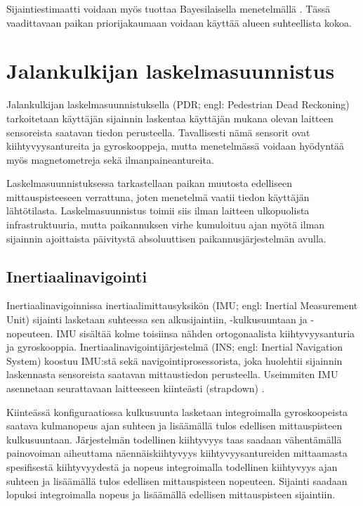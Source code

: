 Sijaintiestimaatti voidaan myös tuottaa Bayesilaisella menetelmällä
\cite{honkavirta2009}. Tässä vaadittavaan paikan priorijakaumaan voidaan
käyttää alueen suhteellista kokoa.

\section{Jalankulkijan laskelmasuunnistus}

Jalankulkijan laskelmasuunnistuksella (PDR; engl: Pedestrian Dead Reckoning)
tarkoitetaan käyttäjän sijainnin laskentaa käyttäjän mukana olevan laitteen
sensoreista saatavan tiedon perusteella. Tavallisesti nämä sensorit ovat
kiihtyvyysantureita ja gyroskooppeja, mutta menetelmässä voidaan hyödyntää myös
magnetometreja sekä ilmanpaineantureita.

Laskelmasuunnistuksessa tarkastellaan paikan muutosta edelliseen
mittauspisteeseen verrattuna, joten menetelmä vaatii tiedon käyttäjän
lähtötilasta. Laskelmasuunnistus toimii siis ilman laitteen ulkopuolista
infrastruktuuria, mutta paikannuksen virhe kumuloituu ajan myötä ilman
sijainnin ajoittaista päivitystä absoluuttisen paikannusjärjestelmän avulla.

\subsection{Inertiaalinavigointi}

Inertiaalinavigoinnissa inertiaalimittausyksikön (IMU; engl: Inertial
Measurement Unit) sijainti lasketaan suhteessa sen alkusijaintiin,
-kulkusuuntaan ja -nopeuteen. IMU sisältää kolme toisiinsa nähden
ortogonaalista kiihtyvyysanturia ja gyroskooppia.
Inertiaalinavigointijärjestelmä (INS; engl: Inertial Navigation System) koostuu
IMU:stä sekä navigointiprosessorista, joka huolehtii sijainnin laskennasta
sensoreista saatavan mittaustiedon perusteella. Useimmiten IMU asennetaan
seurattavaan laitteeseen kiinteästi (strapdown) \cite{harle2013}.

Kiinteässä konfiguraatiossa kulkusuunta lasketaan integroimalla gyroskoopeista
saatava kulmanopeus ajan suhteen ja lisäämällä tulos edellisen mittauspisteen
kulkusuuntaan. Järjestelmän todellinen kiihtyvyys taas saadaan vähentämällä
painovoiman aiheuttama näennäiskiihtyvyys kiihtyvyysantureiden mittaamasta
spesifisestä kiihtyvyydestä ja nopeus integroimalla todellinen kiihtyvyys ajan
suhteen ja lisäämällä tulos edellisen mittauspisteen nopeuteen. Sijainti
saadaan lopuksi integroimalla nopeus ja lisäämällä edellisen mittauspisteen
sijaintiin.

